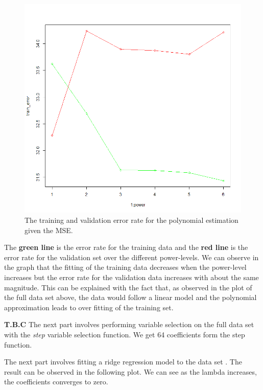 \documentclass[a4paper,12pt]{article}
\begin{document}
\begin{figure}[H]
\centering
\begin{minipage}[]{0.75\textwidth}
  \includegraphics[width=\textwidth]{figures/Lab2A2_test_train_err.png}  
  \caption{The training and validation error rate for the polynomial estimation given the MSE.}
 \end{minipage}
\end{figure}

The \textbf{green line} is the error rate for the training data and the \textbf{red line} is the error rate for the validation set over the different power-levels. We can observe in the graph that the fitting of the training data decreases when the power-level increases but the error rate for the validation data increases with about the same magnitude. This can be explained with the fact that, as observed in the plot of the full data set above, the data would follow a linear model and the polynomial approximation leads to over fitting of the training set.  


\textbf{T.B.C}
The next part involves performing variable selection on the full data set with the \textit{step} variable selection function. We get 64 coefficients form the step function.

The next part involves fitting a ridge regression model to the data set . The result can be observed in the following plot. We can see as the lambda increases, the coefficients converges to zero.
\end{document}
